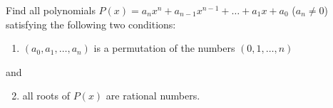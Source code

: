 \documentclass{article}
\begin{document}
\setlength{\parindent}{0pt}
Find all polynomials $P(x)=a_{n}x^{n}+a_{n-1}x^{n-1}+\dots+a_{1}x+a_{0}$ ($a_{n}\ne0$) satisfying the following two conditions:
\begin{enumerate}[label=(\roman*)]
\item $(a_{0},a_{1},\dots,a_{n})$ is a permutation of the numbers $(0,1,\dots,n)$
\end{enumerate}
and
\begin{enumerate}[label=(\roman*)]
\setcounter{enumi}{1}
\item all roots of $P(x)$ are rational numbers.
\end{enumerate}
\end{document}
